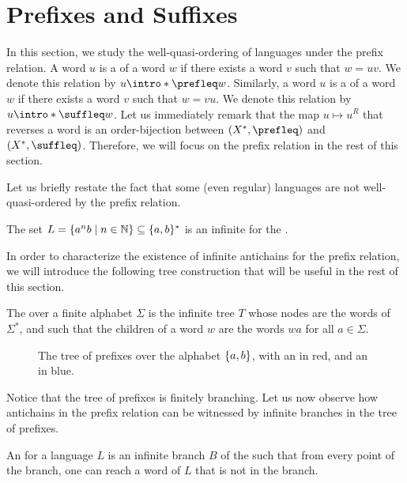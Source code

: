 \section{Prefixes and Suffixes}
\label{prefixes-suffixes:sec}

In this section, we study the well-quasi-ordering of languages under the prefix
relation. A word $u$ is a  of a word $w$ if there exists a word
$v$ such that $w = uv$. We denote this relation by $u \intro*\prefleq w$.
Similarly, a word $u$ is a  of a word $w$ if there exists a word
$v$ such that $w = vu$. We denote this relation by $u \intro*\suffleq w$. Let
us immediately remark that the map $u \mapsto u^R$ that reverses a word is an
order-bijection between $(X^*, \prefleq)$ and $(X^*, \suffleq)$. Therefore, we
will focus on the prefix relation in the rest of this section.


Let us briefly restate the fact that some (even regular) languages 
are not well-quasi-ordered by the prefix relation.

\begin{example}
    The set $L = \{ a^nb \mid n \in \mathbb{N} \} \subseteq \{ a,b \}^*$ is an infinite  for the
    .
\end{example}

In order to characterize the existence of infinite antichains for the prefix
relation, we will introduce the following tree construction that
will be useful in the rest of this section.

\begin{definition}
    The  over a finite alphabet $\Sigma$
    is the infinite tree $T$ whose nodes are the words of $\Sigma^*$, and
    such that the children of a word $w$ are the words $wa$ for all $a \in
    \Sigma$. 
\end{definition}

\begin{figure}
    \centering
    \caption{The tree of prefixes over the alphabet $\{ a,b \}$,
        with an  in red, and
        an  in blue.}
\end{figure}

Notice that the tree of prefixes is finitely branching. Let us now
observe how antichains in the prefix relation can be witnessed
by infinite branches in the tree of prefixes.

\begin{definition}
    An  for a language $L$ is an infinite 
    branch $B$ of the  such that from every point of the branch, 
    one can reach a word of $L$ that is not in the branch.
\end{definition}

